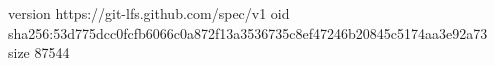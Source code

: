 version https://git-lfs.github.com/spec/v1
oid sha256:53d775dcc0fcfb6066c0a872f13a3536735c8ef47246b20845c5174aa3e92a73
size 87544
